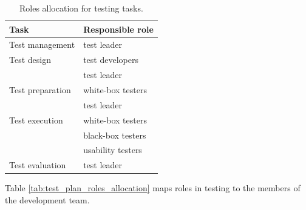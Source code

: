 \documentclass[11pt]{book}
\begin{document}
\begin{table}[H]
    \centering
    \begin{tabular}{| l | l |}
        \hline
        Task                & Responsible role              \\ \hline

        Test management     & test leader                   \\ \hline
        
        Test design         & test developers               \\
                            & test leader                   \\ \hline
        
        Test preparation    & white-box testers             \\
                            & test leader                   \\ \hline
        
        Test execution      & white-box testers             \\
                            & black-box testers             \\
                            & usability testers             \\ \hline
        
        Test evaluation     & test leader                   \\ \hline
    \end{tabular}
    \caption{Roles allocation for testing tasks.}
    \label{tab:test_plan_tasks_allocation}
\end{table}

Table \ref{tab:test_plan_roles_allocation} maps roles in testing to the members of the development team.
\end{document}

